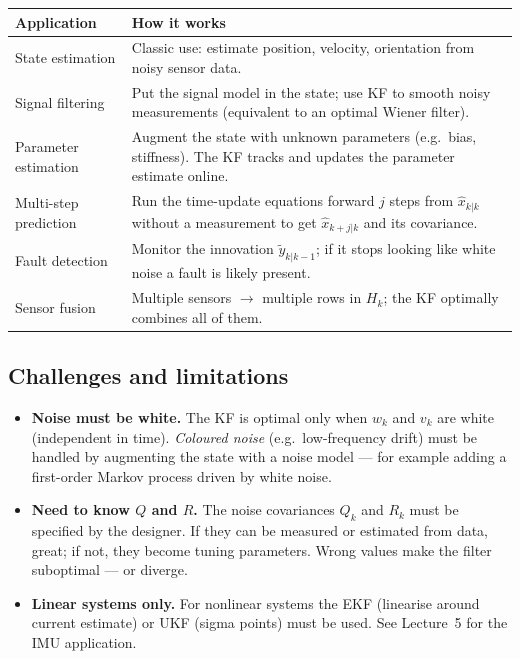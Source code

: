 \documentclass[12pt, a4paper]{article}
\begin{document}
\begin{center}
\renewcommand{\arraystretch}{1.5}
\begin{tabular}{p{4cm} p{10cm}}
  \toprule
  \textbf{Application} & \textbf{How it works} \\
  \midrule
  State estimation &
    Classic use: estimate position, velocity, orientation from
    noisy sensor data. \\
  Signal filtering &
    Put the signal model in the state; use KF to smooth noisy
    measurements (equivalent to an optimal Wiener filter). \\
  Parameter estimation &
    Augment the state with unknown parameters
    (e.g.\ bias, stiffness).
    The KF tracks and updates the parameter estimate online. \\
  Multi-step prediction &
    Run the time-update equations forward $j$ steps from
    $\hat{x}_{k|k}$ without a measurement to get
    $\hat{x}_{k+j|k}$ and its covariance. \\
  Fault detection &
    Monitor the innovation $\tilde{y}_{k|k-1}$; if it stops
    looking like white noise a fault is likely present. \\
  Sensor fusion &
    Multiple sensors $\to$ multiple rows in $H_k$; the KF
    optimally combines all of them. \\
  \bottomrule
\end{tabular}
\end{center}

\subsection*{Challenges and limitations}

\begin{itemize}[leftmargin=1.4em]
  \item \textbf{Noise must be white.}
        The KF is optimal only when $w_k$ and $v_k$ are white
        (independent in time).
        \emph{Coloured noise} (e.g.\ low-frequency drift) must be
        handled by augmenting the state with a noise model --- for
        example adding a first-order Markov process driven by white
        noise.

  \item \textbf{Need to know $Q$ and $R$.}
        The noise covariances $Q_k$ and $R_k$ must be specified
        by the designer.
        If they can be measured or estimated from data, great; if
        not, they become tuning parameters.
        Wrong values make the filter suboptimal --- or diverge.

  \item \textbf{Linear systems only.}
        For nonlinear systems the EKF (linearise around current
        estimate) or UKF (sigma points) must be used.
        See Lecture~5 for the IMU application.
\end{itemize}
\end{document}
